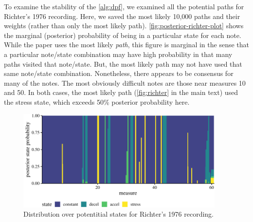\documentclass[aoas]{aoas/imsart}
\begin{document}
To examine the stability of the \autoref{alg:dpf}, we examined all the
potential paths for Richter's 1976 recording. Here, we saved the most
likely 10,000 paths and their weights (rather than only the most likely
path). \autoref{fig:posterior-richter-plot} shows the marginal
(posterior) probability of being in a particular state for each note.
While the paper uses the most likely \emph{path}, this figure is
marginal in the sense that a particular note/state combination may have
high probability in that many paths visited that note/state. But, the
most likely path may not have used that same note/state combination.
Nonetheless, there appears to be consensus for many of the notes. The
most obviously difficult notes are those near measures 10 and 50. In
both cases, the most likely path (\autoref{fig:richter} in the main
text) used the stress state, which exceeds 50\% posterior probability
here.

\begin{figure}

{\centering \includegraphics[height=2in]{gfx/posterior-richter-plot-1} 

}

\caption{Distribution over potentitial states for Richter's 1976 recording.}\label{fig:posterior-richter-plot}
\end{figure}


\clearpage



\end{document}

